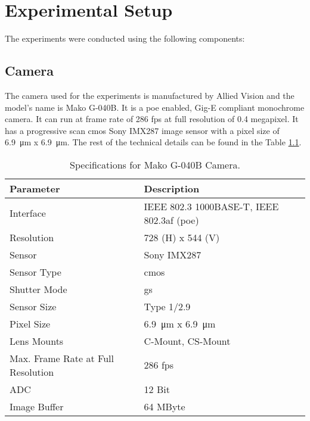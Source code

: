 \chapter{Experimental Setup}

The experiments were conducted using the following components:

\section*{Camera}
    The camera used for the experiments is manufactured by Allied Vision and the model's name is Mako G-040B. It is a \gls{poe} enabled, Gig-E compliant monochrome camera. It can run at frame rate of 286 \gls{fps} at full resolution of 0.4 megapixel. It has a progressive scan \gls{cmos} Sony IMX287 image sensor with a pixel size of \SI{6.9}{\micro\meter} x \SI{6.9}{\micro\meter}. The rest of the technical details can be found in the Table \ref{table:camera_specs}.

    \begin{table}[h]
        \centering
        \footnotesize
        \renewcommand{\arraystretch}{1.2}
        \begin{tabular}{p{6cm}p{7cm}}
            \toprule
            \textbf{Parameter} & \textbf{Description} \\
            \midrule
            Interface & IEEE 802.3 1000BASE-T, IEEE 802.3af (\gls{poe})\\
            Resolution & 728 (H) x 544 (V)\\
            Sensor & Sony IMX287\\
            Sensor Type & \gls{cmos}\\
            Shutter Mode & \gls{gs}\\
            Sensor Size & Type 1/2.9\\
            Pixel Size & \SI{6.9}{\micro\meter} x \SI{6.9}{\micro\meter}\\
            Lens Mounts & C-Mount, CS-Mount\\
            Max. Frame Rate at Full Resolution & 286 \gls{fps}\\
            ADC & 12 Bit\\
            Image Buffer & 64 MByte\\
            \bottomrule
        \end{tabular}
        \caption{Specifications for Mako G-040B Camera. \cite{mako_camera}}
        \label{table:camera_specs}
    \end{table}


